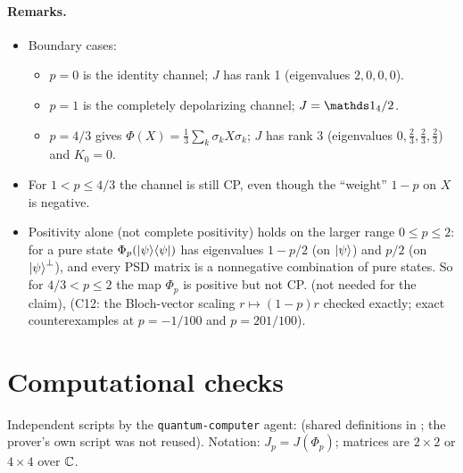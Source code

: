 \documentclass[11pt]{article}
\begin{document}
\paragraph{Remarks.}
\begin{itemize}
  \item Boundary cases:
    \begin{itemize}
      \item $p=0$ is the identity channel; $J$ has rank 1 (eigenvalues $2,0,0,0$).
      \item $p=1$ is the completely depolarizing channel; $J=\id_4/2$.
      \item $p=4/3$ gives $\Phi(X)=\tfrac13\sum_k\sigma_kX\sigma_k$; $J$ has rank 3 (eigenvalues
        $0,\tfrac23,\tfrac23,\tfrac23$) and $K_0=0$.
    \end{itemize}
  \item For $1<p\le4/3$ the channel is still CP, even though the ``weight'' $1-p$ on $X$ is
    negative.
  \item Positivity alone (not complete positivity) holds on the larger range $0\le p\le 2$: for a
    pure state $\Phi_p(\left\lvert \psi \right\rangle\!\left\langle \psi \right\rvert)$ has eigenvalues $1-p/2$ (on $\left\lvert \psi \right\rangle$) and $p/2$ (on
    $\left\lvert \psi \right\rangle^\perp$), and every PSD matrix is a nonnegative combination of pure states. So for
    $4/3<p\le2$ the map $\Phi_p$ is positive but not CP. \own{} (not needed for the claim),
    \computed{} (C12: the Bloch-vector scaling $r\mapsto(1-p)r$ checked exactly; exact
    counterexamples at $p=-1/100$ and $p=201/100$).
\end{itemize}

\section*{Computational checks}
Independent scripts by the \texttt{quantum-computer} agent:
 (shared definitions in
; the prover's own script
 was not reused). Notation: $J_p=J(\Phi_p)$; matrices are
$2\times2$ or $4\times4$ over $\mathbb{C}$.
\end{document}
